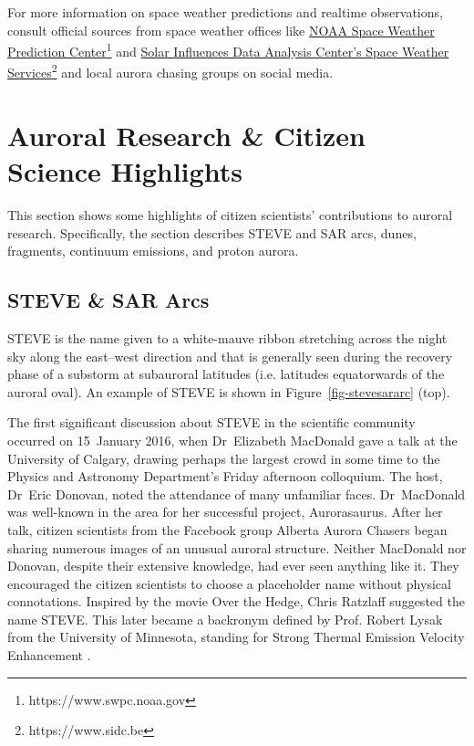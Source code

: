 \documentclass{article}
\renewcommand{\cite}[1]{\parencite{#1}}
\newcommand{\contributed}[1]{%
    \par\noindent
    \begingroup
    \setlength{\leftskip}{1em}%
    \itshape
    Contributors: #1
    \par
    \endgroup
    \vspace{0.5em}
}
\begin{document}
For more information on space weather predictions and realtime observations, consult official sources from space weather offices like \href{https://www.swpc.noaa.gov}{NOAA Space Weather Prediction Center}\footnote{https://www.swpc.noaa.gov} and \href{https://www.sidc.be}{Solar Influences Data Analysis Center's Space Weather Services}\footnote{https://www.sidc.be} and local aurora chasing groups on social media.

\section{Auroral Research \& Citizen Science Highlights}
This section shows some highlights of citizen scientists' contributions to auroral research. Specifically, the section describes STEVE and SAR arcs, dunes, fragments, continuum emissions, and proton aurora.


\subsection{STEVE \& SAR Arcs}\label{steve-sar-arcs}  
STEVE is the name given to a white-mauve ribbon stretching across the night sky along the east--west direction and that is generally seen during the recovery phase of a substorm at subauroral latitudes (i.e. latitudes equatorwards of the auroral oval). An example of STEVE is shown in Figure~\ref{fig-stevesararc} (top).

The first significant discussion about STEVE in the scientific community occurred on 15~January 2016, when Dr~Elizabeth MacDonald gave a talk at the University of Calgary, drawing perhaps the largest crowd in some time to the Physics and Astronomy Department's Friday afternoon colloquium. The host, Dr~Eric Donovan, noted the attendance of many unfamiliar faces. Dr~MacDonald was well-known in the area for her successful project, Aurorasaurus. After her talk, citizen scientists from the Facebook group Alberta Aurora Chasers began sharing numerous images of an unusual auroral structure. Neither MacDonald nor Donovan, despite their extensive knowledge, had ever seen anything like it. They encouraged the citizen scientists to choose a placeholder name without physical connotations. Inspired by the movie Over the Hedge, Chris Ratzlaff suggested the name STEVE. This later became a backronym defined by Prof. Robert Lysak from the University of Minnesota, standing for Strong Thermal Emission Velocity Enhancement \cite{Gallardolacourt_2019}.
\end{document}
